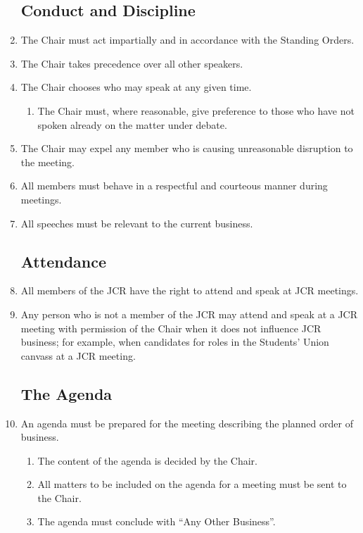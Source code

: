 \documentclass[12pt]{article}
\begin{document}
\begin{enumerate}
    \subsection{Conduct and Discipline}
    \item The Chair must act impartially and in accordance with the Standing Orders.
    \item The Chair takes precedence over all other speakers.
    \item The Chair chooses who may speak at any given time.
    \begin{enumerate}
        \item The Chair must, where reasonable, give preference to those who have not spoken already on the matter under debate.
    \end{enumerate}
    \item The Chair may expel any member who is causing unreasonable disruption to the meeting.
    \item All members must behave in a respectful and courteous manner during meetings.
    \item All speeches must be relevant to the current business.
    \subsection{Attendance}
    \item All members of the JCR have the right to attend and speak at JCR meetings.
    \item Any person who is not a member of the JCR may attend and speak at a JCR meeting with permission of the Chair when it does not influence JCR business; for example, when candidates for roles in the Students’ Union canvass at a JCR meeting.
    \subsection{The Agenda}
    \item An agenda must be prepared for the meeting describing the planned order of business.
    \begin{enumerate}
        \item The content of the agenda is decided by the Chair.
        \item All matters to be included on the agenda for a meeting must be sent to the Chair.
        \item The agenda must conclude with “Any Other Business”.
    \end{enumerate}

\end{enumerate}
\end{document}
